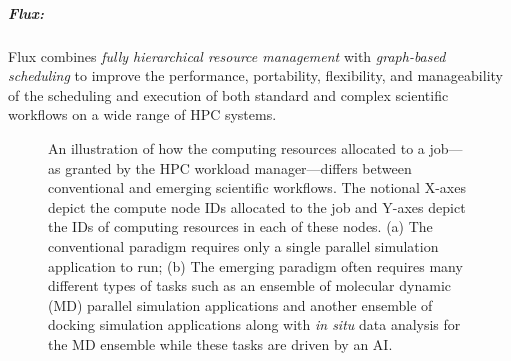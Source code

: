 \subparagraph{Flux:}
Flux combines {\em fully hierarchical resource management}
with {\em graph-based scheduling} to improve
the performance, portability, flexibility,
and manageability of the scheduling
and execution of both standard and
complex scientific workflows on a wide range of HPC systems.
\begin{figure}[ht]
  \hfill
 \caption{An illustration of how the computing resources allocated
to a job---as granted by the HPC workload manager---differs between
conventional and emerging scientific workflows. The notional X-axes
depict the compute node IDs allocated to the job and Y-axes depict
the IDs of computing resources in each of these nodes. (a) The conventional paradigm
requires only a single parallel simulation application to run; (b) The emerging paradigm often requires many different types of tasks such as an ensemble of molecular dynamic (MD) parallel simulation applications and another ensemble of docking simulation applications along with {\em in situ} data analysis for the MD ensemble while these tasks are driven by an AI.}
 \label{fig:layout}
 \end{figure}
